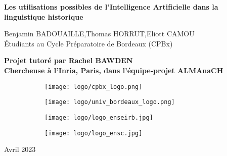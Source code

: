 \documentclass[12pt, twoside]{report}
\begin{document}
\begin{titlepage}
    \centering
    \vspace*{\fill}

    \huge
    \bfseries
    Les utilisations possibles de l'Intelligence Artificielle dans la linguistique historique
    
    \vspace*{2.5cm}
    \large Benjamin BADOUAILLE,\quad Thomas HORRUT,\quad Eliott CAMOU\\
    \mdseries Étudiants au Cycle Préparatoire de Bordeaux (CPBx) 

    \vspace*{1cm}
    \bfseries
    \large Projet tutoré par Rachel BAWDEN\\
    \mdseries Chercheuse à l'Inria, Paris, dans l'équipe-projet ALMAnaCH
    \vspace*{2.5cm}

    \begin{figure}[!h]
        \centering
        \begin{subfigure}[b]{0.2\textwidth}
            \texttt{[image: logo/cpbx\_logo.png]}
        \end{subfigure}\hspace{0,5cm}
        \begin{subfigure}[b]{0.5\textwidth}
            \texttt{[image: logo/univ\_bordeaux\_logo.png]}
        \end{subfigure}
    \end{figure}

    \begin{figure}[!h]
        \centering
        \begin{subfigure}[b]{0.4\textwidth}
            \texttt{[image: logo/logo\_enseirb.jpg]}
        \end{subfigure}\hspace{1cm}
        \begin{subfigure}[b]{0.4\textwidth}
            \texttt{[image: logo/logo\_ensc.jpg]}
        \end{subfigure}
    \end{figure}

    \vspace*{1.5cm}
    \large Avril 2023\\
    
    \vspace*{\fill}
\end{titlepage}
\end{document}
